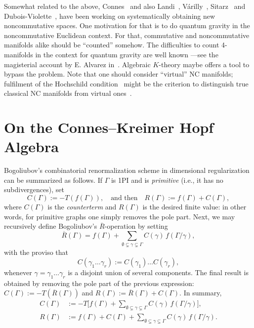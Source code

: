 \documentclass[a4paper,12pt]{article}
\newcommand{\Ga}{\Gamma}            %
\newcommand{\ga}{\gamma}            %
\newcommand{\Rbar}{\overline{R}}    %
\newcommand{\sepword}[1]{\quad\text{#1}\quad} %
\newcommand{\1}{\mathbf{1}}         %
\newcommand{\7}{\dagger}            %
\newcommand{\8}{\bullet}            %
\renewcommand{\.}{\cdot}            %
\renewcommand{\:}{\colon}           %
\begin{document}
\medskip

Somewhat related to the above, Connes~\cite{ConnesSurvey} and also
Landi~\cite{ConnesLa}, V\'arilly~\cite{Larissa},
Sitarz~\cite{SitarzSphere} and Dubois-Violette~\cite{ConnesDV}, have
been working on systematically obtaining new noncommutative spaces.
One motivation for that is to do quantum gravity in the noncommutative
Euclidean context. For that, commutative and noncommutative manifolds
alike should be ``counted'' somehow. The difficulties to count
4-manifolds in the context for quantum gravity are well known ---see
the magisterial account by E. Alvarez in~\cite{AlvarezQgrav}.
Algebraic $K$-theory maybe offers a tool to bypass the problem. Note
that one should consider ``virtual'' NC manifolds; fulfilment of the
Hochschild condition~\cite{ConnesGrav} might be the criterion to
distinguish true classical NC manifolds from virtual
ones~\cite{ConnesRemarkOW}.



\section{On the Connes--Kreimer Hopf Algebra}

Bogoliubov's combinatorial renormalization scheme in dimensional
regularization can be summarized as follows. If $\Ga$ is 1PI and is
\textit{primitive} (i.e., it has no subdivergences), set
$$
C(\Ga) := - T(f(\Ga)),  \sepword{and then}  R(\Ga) := f(\Ga) + C(\Ga),
$$
where $C(\Ga)$ is the \textit{counterterm} and $R(\Ga)$ is the desired
finite value: in other words, for primitive graphs one simply removes
the pole part. Next, we may recursively define Bogoliubov's
$\Rbar$-operation by setting
$$
\Rbar(\Ga) = f(\Ga)
 + \sum_{\emptyset\subsetneq\ga\subsetneq\Ga} C(\ga)\,f(\Ga/\ga),
$$
with the proviso that
\begin{equation}
C(\ga_1\dots\ga_r) := C(\ga_1) \dots C(\ga_r),
\label{eq:mult-ctrtm}
\end{equation}
whenever $\ga = \ga_1\dots\ga_r$ is a disjoint union of several
components. The final result is obtained by removing the pole part of
the previous expression: $C(\Ga) := - T(\Rbar(\Ga))$ and
$R(\Ga) := \Rbar(\Ga) + C(\Ga)$. In summary,
\begin{subequations}
\label{eq:graph-renorm}
\begin{align}
C(\Ga) &:= - T\biggl[ f(\Ga)
+ \sum_{\emptyset\subsetneq\ga\subsetneq\Ga}C(\ga)\,f(\Ga/\ga)\biggr],
\label{eq:graph-renorm-C}
\\
R(\Ga) &:= f(\Ga) + C(\Ga)
 + \sum_{\emptyset\subsetneq\ga\subsetneq\Ga} C(\ga)\,f(\Ga/\ga).
\label{eq:graph-renorm-R}
\end{align}
\end{subequations}
\end{document}
